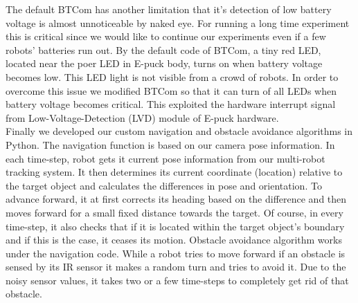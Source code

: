 The default BTCom has another limitation that it's detection of low battery voltage is almost unnoticeable by naked eye. For running a long time experiment this is critical since we would like to continue our experiments even if a few robots' batteries run out. By the default code of BTCom, a tiny red LED, located near the poer LED in E-puck body, turns on when battery voltage becomes low. This LED light is not visible from a crowd of robots. In order to overcome this issue we modified BTCom so that it can turn of all LEDs when battery voltage becomes critical. This exploited the hardware interrupt signal from Low-Voltage-Detection (LVD) module of E-puck hardware.\\
Finally we developed our custom navigation and obstacle avoidance algorithms in Python. The navigation function is based on our camera pose information. In each time-step, robot gets it current pose information from our multi-robot tracking system. It then determines its current coordinate (location) relative to the target object and calculates the differences in pose and orientation. To advance forward, it at first corrects its heading based on the difference and then moves forward for a small fixed distance towards the target. Of course, in every time-step, it also checks that if it is located within the target object's boundary and if this is the case, it ceases its motion. Obstacle avoidance algorithm works under the navigation code. While a robot tries to move forward if an obstacle is sensed by its IR sensor it makes a random turn and tries to avoid it. Due to the noisy sensor values, it takes two or a few time-steps to completely get rid of that obstacle.
